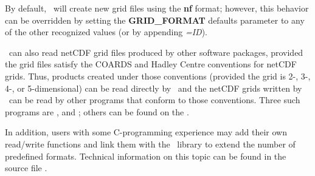 By default, \GMT\ will create new grid files using the \textbf{nf} format; however,
this behavior can be overridden by setting the \textbf{GRID\_FORMAT} defaults parameter
to any of the other recognized values (or by appending \emph{=ID}).

\GMT\ can also read netCDF grid files produced by other software packages, provided the grid files
satisfy the COARDS and Hadley Centre conventions for netCDF grids. Thus, products created under
those conventions (provided the grid is 2-, 3-, 4-, or 5-dimensional) can be read directly by \GMT\ and the netCDF grids
written by \GMT\ can be read by other programs that conform to those conventions. Three such programs are
,
and
; others can be found
on the .

In addition, users with some C-programming experience may add
their own read/write functions and link them with the \GMT\ library
to extend the number of predefined formats.  Technical information
on this topic can be found in the source file . 

